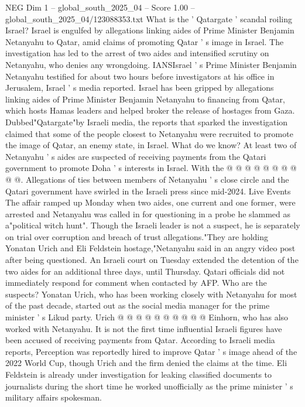 \begin{textsample}{NEG Dim 1 – global\_south\_2025\_04 – Score 1.00 – global\_south\_2025\_04/123088353.txt}  \label{ex:f1_neg_128}
What is the ' Qatargate ' scandal roiling Israel?
Israel is engulfed by allegations linking aides of Prime Minister Benjamin Netanyahu to Qatar, amid claims of promoting Qatar ' s image in Israel.
The investigation has led to the arrest of two aides and intensified scrutiny on Netanyahu, who denies any wrongdoing.
IANSIsrael ' s Prime Minister Benjamin Netanyahu testified for about two hours before investigators at his office in Jerusalem, Israel ' s media reported.
Israel has been gripped by allegations linking aides of Prime Minister Benjamin Netanyahu to financing from Qatar, which hosts Hamas leaders and helped broker the release of hostages from Gaza.
Dubbed"Qatargate"by Israeli media, the reports that sparked the investigation claimed that some of the people closest to Netanyahu were recruited to promote the image of Qatar, an enemy state, in Israel.
What do we know?
At least two of Netanyahu ' s aides are suspected of receiving payments from the Qatari government to promote Doha ' s interests in Israel.
With the @ @ @ @ @ @ @ @ @ @.
Allegations of ties between members of Netanyahu ' s close circle and the Qatari government have swirled in the Israeli press since mid-2024.
Live Events The affair ramped up Monday when two aides, one current and one former, were arrested and Netanyahu was called in for questioning in a probe he slammed as a"political witch hunt".
Though the Israeli leader is not a suspect, he is separately on trial over corruption and breach of trust allegations."They are holding Yonatan Urich and Eli Feldstein hostage,"Netanyahu said in an angry video post after being questioned.
An Israeli court on Tuesday extended the detention of the two aides for an additional three days, until Thursday.
Qatari officials did not immediately respond for comment when contacted by AFP.
Who are the suspects?
Yonatan Urich, who has been working closely with Netanyahu for most of the past decade, started out as the social media manager for the prime minister ' s Likud party.
Urich @ @ @ @ @ @ @ @ @ @ Einhorn, who has also worked with Netanyahu.
It is not the first time influential Israeli figures have been accused of receiving payments from Qatar.
According to Israeli media reports, Perception was reportedly hired to improve Qatar ' s image ahead of the 2022 World Cup, though Urich and the firm denied the claims at the time.
Eli Feldstein is already under investigation for leaking classified documents to journalists during the short time he worked unofficially as the prime minister ' s military affairs spokesman.

\end{textsample}
